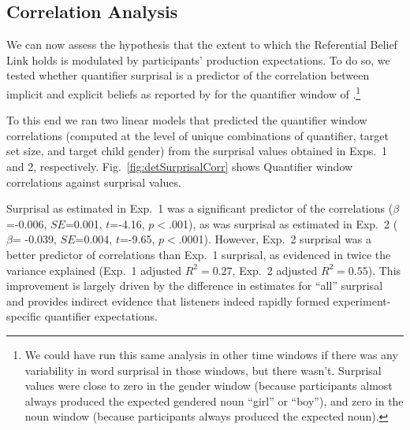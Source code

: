 \documentclass[10pt,letterpaper]{article}
\newcommand{\figref}[1]{Fig.~\ref{#1}}
\newcommand{\jd}[1]{\textcolor{Pink}{[jd: #1]}}
\newcommand{\stp}[1]{\textcolor{Blue}{[sp: #1]}}
\begin{document}
\subsection{Correlation Analysis}
We can now assess the hypothesis that the extent to which the Referential Belief Link holds is modulated by participants' production expectations. To do so, we tested whether quantifier surprisal is a predictor of the correlation between implicit and explicit beliefs as reported by  for the quantifier window of .\footnote{We could have  run this same analysis in other time windows if there was any variability in word surprisal in those windows, but there wasn't. Surprisal values were close to zero in the gender window (because participants almost always produced the expected gendered noun ``girl'' or ``boy''), and zero in the noun window (because participants always produced the expected noun).} 


To this end we ran two linear models that predicted the quantifier window correlations (computed at the level of unique combinations of quantifier, target set size, and target child gender) from the surprisal values obtained in Exps.~1 and 2, respectively.
\figref{fig:detSurprisalCorr} shows Quantifier window correlations against surprisal values.  

Surprisal as estimated in Exp.~1 was a significant predictor of the correlations ($\beta$=-0.006, $SE$=0.001, $t$=-4.16, $p<$.001), as was surprisal as estimated in Exp.~2 ($\beta$= -0.039, $SE$=0.004, $t$=-9.65, $p<$.0001). However, Exp.~2 surprisal was a better predictor of correlations than Exp.~1 surprisal, as evidenced in twice the variance explained (Exp.~1 adjusted $R^2 = 0.27$, Exp.~2 adjusted $R^2 = 0.55$). This improvement is largely driven by the difference in estimates for ``all'' surprisal and provides indirect evidence that listeners indeed rapidly formed experiment-specific quantifier expectations. 
\end{document}
